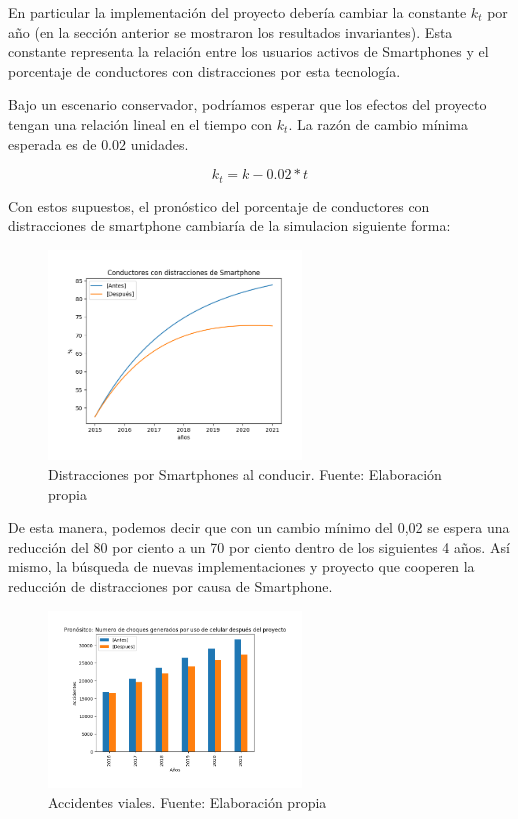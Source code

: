 \documentclass{article}
\begin{document}
En particular la implementación del proyecto debería cambiar la constante $k_t$ por año (en la sección anterior
se mostraron los resultados invariantes). Esta constante representa la relación entre los usuarios activos de Smartphones
y el porcentaje de conductores con distracciones por esta tecnología.

Bajo un escenario conservador, podríamos esperar que los efectos del proyecto tengan una relación lineal en el tiempo
con $k_t$. La razón de cambio mínima esperada es de $0.02$ unidades.

\begin{equation}
k_{t} = k - 0.02 * t
\end{equation}

Con estos supuestos, el pronóstico del porcentaje de conductores con distracciones de smartphone cambiaría de la simulaci{on }
siguiente forma:

	\begin{figure}[H]\centering
	\includegraphics[width=0.6\textwidth]{resources/img/distraction_compare_img.png}
	\caption{\label{fig:smart_accidents_compare} Distracciones por Smartphones al conducir. Fuente: Elaboración propia}
    \end{figure}

De esta manera, podemos decir que con un cambio mínimo del 0,02 se espera una reducción del 80 por ciento  a un 70 por ciento dentro de los siguientes 4 años. Así mismo, la búsqueda de nuevas implementaciones y proyecto que cooperen la reducción de distracciones por causa de Smartphone. 


	\begin{figure}[H]\centering
	\includegraphics[width=0.6\textwidth]{resources/img/smart_accidents_after.png}
	\caption{\label{fig:smart_accidents_after} Accidentes viales. Fuente: Elaboración propia}
    \end{figure}
\end{document}
